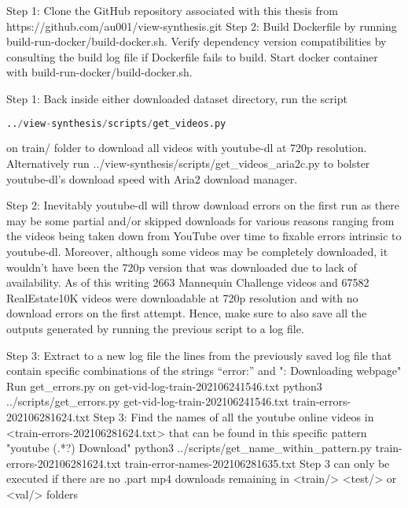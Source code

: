 Step 1: Clone the GitHub repository associated with this thesis from https://github.com/au001/view-synthesis.git
Step 2: Build Dockerfile by running build-run-docker/build-docker.sh. Verify dependency version compatibilities by consulting the build log file if Dockerfile fails to build. Start docker container with build-run-docker/build-docker.sh.


Step 1: Back inside either downloaded dataset directory, run the script \begin{lstlisting}[language=Python] ../view-synthesis/scripts/get_videos.py \end{lstlisting} on train/ folder to download all videos with youtube-dl at 720p resolution. Alternatively run ../view-synthesis/scripts/get_videos_aria2c.py to bolster youtube-dl’s download speed with Aria2 download manager.  

Step 2: Inevitably youtube-dl will throw download errors on the first run as there may be some partial and/or skipped downloads for various reasons ranging from the videos being taken down from YouTube over time to fixable errors intrinsic to youtube-dl. Moreover, although some videos may be completely downloaded, it wouldn’t have been the 720p version that was downloaded due to lack of availability. As of this writing 2663 Mannequin Challenge videos and 67582 RealEstate10K videos were downloadable at 720p resolution and with no download errors on the first attempt. Hence, make sure to also save all the outputs generated by running the previous script to a log file.

Step 3: Extract to a new log file the lines from the previously saved log file that contain specific combinations of the strings “error:” and ": Downloading webpage" Run get_errors.py on get-vid-log-train-202106241546.txt
python3 ../scripts/get_errors.py get-vid-log-train-202106241546.txt train-errors-202106281624.txt
Step 3: Find the names of all the youtube online videos in <train-errors-202106281624.txt> that can be found in this specific pattern
"youtube\] (.*?)\: Download"
python3 ../scripts/get_name_within_pattern.py train-errors-202106281624.txt train-error-names-202106281635.txt
Step 3 can only be executed if there are no .part mp4 downloads remaining in <train/> <test/> or <val/> folders
 
